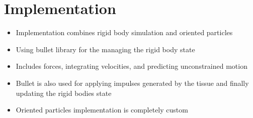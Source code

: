 \section{Implementation}

\label{sec:implementation}

\begin{itemize}
\item Implementation combines rigid body simulation and oriented particles
\item Using bullet library for the managing the rigid body state
\item Includes forces, integrating velocities, and predicting unconstrained motion
\item Bullet is also used for applying impulses generated by the tissue and finally updating the rigid bodies state
\item Oriented particles implementation is completely custom
\end{itemize}

